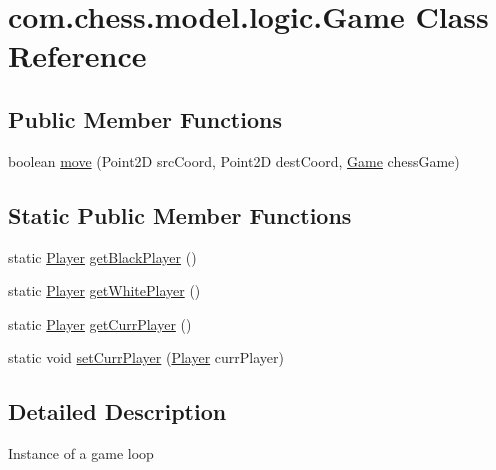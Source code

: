 \hypertarget{classcom_1_1chess_1_1model_1_1logic_1_1_game}{}\section{com.\+chess.\+model.\+logic.\+Game Class Reference}
\label{classcom_1_1chess_1_1model_1_1logic_1_1_game}
\subsection*{Public Member Functions}
\begin{DoxyCompactItemize}
\item 
boolean \mbox{\hyperlink{classcom_1_1chess_1_1model_1_1logic_1_1_game_a8b252fc97255bc97c3d0ca4e6c84075a}{move}} (Point2D src\+Coord, Point2D dest\+Coord, \mbox{\hyperlink{classcom_1_1chess_1_1model_1_1logic_1_1_game}{Game}} chess\+Game)
\end{DoxyCompactItemize}
\subsection*{Static Public Member Functions}
\begin{DoxyCompactItemize}
\item 
static \mbox{\hyperlink{classcom_1_1chess_1_1model_1_1logic_1_1_player}{Player}} \mbox{\hyperlink{classcom_1_1chess_1_1model_1_1logic_1_1_game_a54b319aa414508325f4e4d9ce3df4f70}{get\+Black\+Player}} ()
\item 
static \mbox{\hyperlink{classcom_1_1chess_1_1model_1_1logic_1_1_player}{Player}} \mbox{\hyperlink{classcom_1_1chess_1_1model_1_1logic_1_1_game_afd1364d602fbcaca1eb25466b099fd7b}{get\+White\+Player}} ()
\item 
static \mbox{\hyperlink{classcom_1_1chess_1_1model_1_1logic_1_1_player}{Player}} \mbox{\hyperlink{classcom_1_1chess_1_1model_1_1logic_1_1_game_ac088d989230b7402c385595bacf1d5df}{get\+Curr\+Player}} ()
\item 
static void \mbox{\hyperlink{classcom_1_1chess_1_1model_1_1logic_1_1_game_a45241336a874716154182f76c045c1ea}{set\+Curr\+Player}} (\mbox{\hyperlink{classcom_1_1chess_1_1model_1_1logic_1_1_player}{Player}} curr\+Player)
\end{DoxyCompactItemize}


\subsection{Detailed Description}
Instance of a game loop 

